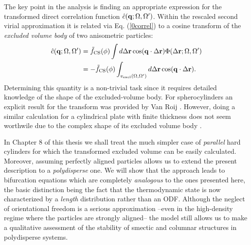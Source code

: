 \documentclass[amssymb]{revtex4}
\newcommand{\bfr}{{\bf r}}
\newcommand{\vq}{{\bf q}}
\begin{document}
The key point in the analysis is finding an appropriate
expression for the transformed  direct correlation function $\hat{c}(\vq;\Omega,\Omega^{\prime})$.
Within the rescaled second virial approximation it is  related 
via  Eq. (\ref{0correl})
to a cosine transform of the {\em excluded volume body} of two anisometric particles: 
\begin{align}
\hat{c}(\vq;\Omega,\Omega ^{\prime})&=\tilde{f}_{\text{CS}} (\phi) \int d \Delta \bfr
\cos(\vq \cdot \Delta \bfr) \Phi(\Delta \bfr; \Omega,\Omega^{\prime}) \nonumber \\
&= -\tilde{f}_{\text{CS}} (\phi) \int _{v_{\text{excl}}(\Omega,\Omega^{\prime})} d \Delta \bfr
\cos(\vq \cdot \Delta \bfr). \label{0mayertrans}
\end{align}
Determining this quantity  is a non-trivial task since it requires
detailed knowledge of the shape of the excluded-volume body.
For spherocylinders an explicit result for the transform was provided by Van Roij \cite{vroijthesis}. 
However, doing a similar calculation for a cylindrical plate with finite thickness 
does not seem worthwile due to the complex shape of its excluded volume body
\cite{unpublished}.


In Chapter 8 of this thesis we shall treat the much simpler case of {\em parallel}
hard cylinders for which the transformed excluded volume
can be easily calculated. 
Moreover,  assuming perfectly aligned particles allows us
to extend the present description 
to a {\em polydisperse} one.  
We will show that the approach leads to bifurcation equations 
which are completely {\em analogous} to the ones
presented here, the basic distinction being
the fact that the thermodynamic state is now characterized by 
a {\em length} distribution rather than an ODF.
Although the neglect of orientational freedom is a serious approximation
--even in the high-density regime where the particles are strongly aligned--
the model still allows us to make a qualitative assessment of the stability
of smectic and columnar structures in polydisperse systems.


 



\end{document}
